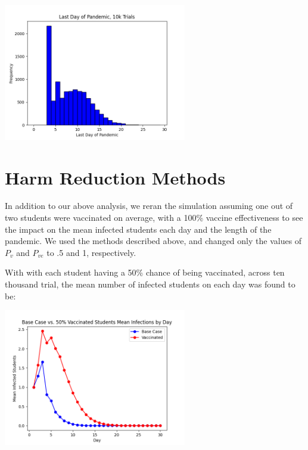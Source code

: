 \documentclass[
	letterpaper, %
]{jdf}
\begin{document}
\begin{jdffigure}
\includegraphics[height=6cm]{Figures/q4b.png}%
\end{jdffigure}

\section{Harm Reduction Methods}
In addition to our above analysis, we reran the simulation assuming one out of two students were vaccinated on average, with a 100\% vaccine effectiveness to see the impact on the mean infected students each day and the length of the pandemic. We used the methods described above, and changed only the values of \(P_v\) and \(P_{ve}\) to .5 and 1, respectively. 

With with each student having a 50\% chance of being vaccinated, across ten thousand trial, the mean number of infected students on each day was found to be:

\begin{jdffigure}
\includegraphics[height=6cm]{Figures/Q5a.png}%
\end{jdffigure}
\end{document}
